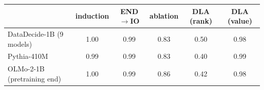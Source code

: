 \begin{tabular}{lccccc}
\toprule
& induction & END$\to$IO & ablation & DLA (rank) & DLA (value) \\
\midrule
DataDecide-1B (9 models) & 1.00 & 0.99 & 0.83 & 0.50 & 0.98 \\
Pythia-410M & 0.99 & 0.99 & 0.83 & 0.40 & 0.99 \\
OLMo-2-1B (pretraining end) & 1.00 & 0.99 & 0.86 & 0.42 & 0.98 \\
\bottomrule
\end{tabular}
